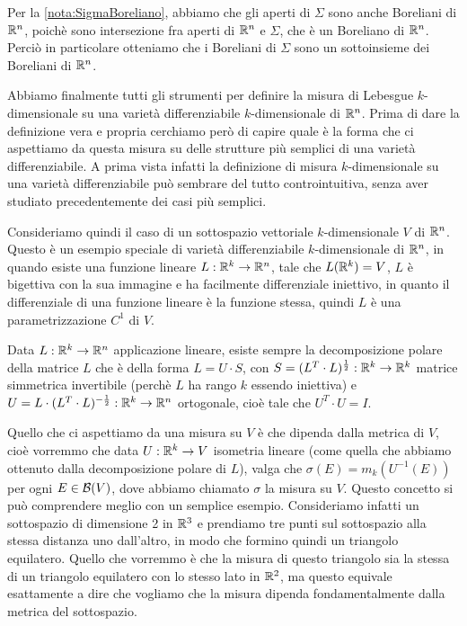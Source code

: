 \begin{remark}\label{nota:BorelianiSottovarieta}
	Per la \cref{nota:SigmaBoreliano}, abbiamo che gli aperti di $\Sigma$ sono anche Boreliani di $\mathbb R^n$, poichè sono intersezione fra aperti di $\mathbb R^n$ e $\Sigma$, che è un Boreliano di $\mathbb R^n$. Perciò in particolare otteniamo che i Boreliani di $\Sigma$ sono un sottoinsieme dei Boreliani di $\mathbb R^n$.
\end{remark}

Abbiamo finalmente tutti gli strumenti per definire la misura di Lebesgue $k$-dimensionale su una varietà differenziabile $k$-dimensionale di $\mathbb R^n$. Prima di dare la definizione vera e propria cerchiamo però di capire quale è la forma che ci aspettiamo da questa misura su delle strutture più semplici di una varietà differenziabile. A prima vista infatti la definizione di misura $k$-dimensionale su una varietà differenziabile può sembrare del tutto controintuitiva, senza aver studiato precedentemente dei casi più semplici.

Consideriamo quindi il caso di un sottospazio vettoriale $k$-dimensionale $V$ di $\mathbb R^n$. Questo è un esempio speciale di varietà differenziabile $k$-dimensionale di $\mathbb R^n$, in quando esiste una funzione lineare $L:\mathbb R^k\to \mathbb R^n$, tale che $L(\mathbb R^k)=V$, $L$ è bigettiva con la sua immagine e ha facilmente differenziale iniettivo, in quanto il differenziale di una funzione lineare è la funzione stessa, quindi $L$ è una parametrizzazione $C^1$ di $V$.

Data $L:\mathbb R^k\to\mathbb R^n$ applicazione lineare, esiste sempre la decomposizione polare della matrice $L$ che è della forma $L=U\cdot S$, con $S=(L^T\cdot L)^{\frac 12}:\mathbb R^k\to\mathbb R^k$ matrice simmetrica invertibile (perchè $L$ ha rango $k$ essendo iniettiva) e $U=L\cdot (L^T\cdot L)^{-\frac 12}:\mathbb R^k\to\mathbb R^n$ ortogonale, cioè tale che $U^T\cdot U=I$.

Quello che ci aspettiamo da una misura su $V$ è che dipenda dalla metrica di $V$, cioè vorremmo che data $U:\mathbb R^k\to V$ isometria lineare (come quella che abbiamo ottenuto dalla decomposizione polare di $L$), valga che $\sigma(E)=m_k(U^{-1}(E))$ per ogni $E\in\mathcal B(V)$, dove abbiamo chiamato $\sigma$ la misura su $V$. Questo concetto si può comprendere meglio con un semplice esempio. Consideriamo infatti un sottospazio di dimensione 2 in $\mathbb R^3$ e prendiamo tre punti sul sottospazio alla stessa distanza uno dall'altro, in modo che formino quindi un triangolo equilatero. Quello che vorremmo è che la misura di questo triangolo sia la stessa di un triangolo equilatero con lo stesso lato in $\mathbb R^2$, ma questo equivale esattamente a dire che vogliamo che la misura dipenda fondamentalmente dalla metrica del sottospazio.

